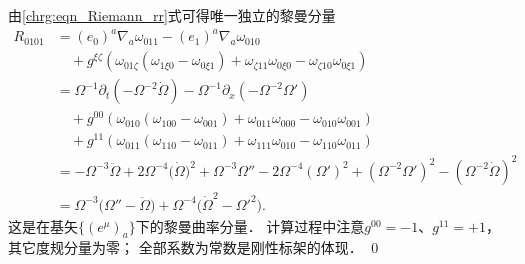 \noindent {}
由\eqref{chrg:eqn_Riemann_rr}式可得唯一独立的黎曼分量
\begin{align*}
R_{0101} &= (e_0)^a\nabla_a \omega_{011} - (e_1)^a\nabla_a \omega_{010}  \\
&{\quad} + g^{\xi\zeta} \left(
 \omega_{01\zeta} ( \omega_{1\xi 0} - \omega_{0\xi 1} )
+ \omega _{\zeta 11} \omega _{0\xi 0} -\omega _{\zeta 10} \omega _{0\xi 1} \right)   \\
&= \Omega^{-1}\partial_t \left(-\Omega^{-2} \dot{\Omega} \right)
  -\Omega^{-1}\partial_x \left(-\Omega^{-2} \Omega' \right)  \\
&{\quad} + g^{00} ( \omega_{010} (\omega_{100} - \omega_{001} )
+ \omega _{011} \omega _{000} -\omega _{010} \omega _{001} )   \\
&{\quad} + g^{11} ( \omega_{011} ( \omega_{110} - \omega_{011} )
+ \omega _{111} \omega _{010} -\omega _{110} \omega _{011} )   \\
&= -\Omega^{-3} \ddot{\Omega} +2 \Omega^{-4}  \bigl(\dot{\Omega}\bigr)^2
+\Omega^{-3} \Omega'' -2 \Omega^{-4}  (\Omega')^2
 + \left( \Omega^{-2} \Omega' \right)^2
- \left( \Omega^{-2} \dot{\Omega} \right)^2     \\
&= \Omega^{-3} \bigl(\Omega'' -\ddot{\Omega} \bigr)
   +\Omega^{-4} \bigl(\dot{\Omega}^2 - \Omega'^2 \bigr).
\end{align*}
这是在基矢$\{(e^\mu)_{a}\}$下的黎曼曲率分量．
计算过程中注意$g^{00}=-1$、$g^{11}=+1$，其它度规分量为零；
全部系数为常数是刚性标架的体现．
\qed


